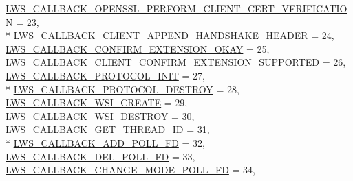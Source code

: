\begin{DoxyCompactItemize}
\hyperlink{group__usercb_ggad62860e19975ba4c4af401c3cdb6abf7ae5ad65d779b7eab32ab67ceff91a3bac}{L\+W\+S\+\_\+\+C\+A\+L\+L\+B\+A\+C\+K\+\_\+\+O\+P\+E\+N\+S\+S\+L\+\_\+\+P\+E\+R\+F\+O\+R\+M\+\_\+\+C\+L\+I\+E\+N\+T\+\_\+\+C\+E\+R\+T\+\_\+\+V\+E\+R\+I\+F\+I\+C\+A\+T\+I\+ON} = 23, 
\\*
\hyperlink{group__usercb_ggad62860e19975ba4c4af401c3cdb6abf7a909cc2a7018864b0b71abacc4058fd8f}{L\+W\+S\+\_\+\+C\+A\+L\+L\+B\+A\+C\+K\+\_\+\+C\+L\+I\+E\+N\+T\+\_\+\+A\+P\+P\+E\+N\+D\+\_\+\+H\+A\+N\+D\+S\+H\+A\+K\+E\+\_\+\+H\+E\+A\+D\+ER} = 24, 
\hyperlink{group__usercb_ggad62860e19975ba4c4af401c3cdb6abf7a390da3639296660a78cc1a5dcb19037e}{L\+W\+S\+\_\+\+C\+A\+L\+L\+B\+A\+C\+K\+\_\+\+C\+O\+N\+F\+I\+R\+M\+\_\+\+E\+X\+T\+E\+N\+S\+I\+O\+N\+\_\+\+O\+K\+AY} = 25, 
\hyperlink{group__usercb_ggad62860e19975ba4c4af401c3cdb6abf7a1ce5b22039ca37ee224d00047596ea46}{L\+W\+S\+\_\+\+C\+A\+L\+L\+B\+A\+C\+K\+\_\+\+C\+L\+I\+E\+N\+T\+\_\+\+C\+O\+N\+F\+I\+R\+M\+\_\+\+E\+X\+T\+E\+N\+S\+I\+O\+N\+\_\+\+S\+U\+P\+P\+O\+R\+T\+ED} = 26, 
\hyperlink{group__usercb_ggad62860e19975ba4c4af401c3cdb6abf7ad5d34583e3556e153eda91620b48cc49}{L\+W\+S\+\_\+\+C\+A\+L\+L\+B\+A\+C\+K\+\_\+\+P\+R\+O\+T\+O\+C\+O\+L\+\_\+\+I\+N\+IT} = 27, 
\\*
\hyperlink{group__usercb_ggad62860e19975ba4c4af401c3cdb6abf7a54269ca88508e6efd3afdb9d360a9caa}{L\+W\+S\+\_\+\+C\+A\+L\+L\+B\+A\+C\+K\+\_\+\+P\+R\+O\+T\+O\+C\+O\+L\+\_\+\+D\+E\+S\+T\+R\+OY} = 28, 
\hyperlink{group__usercb_ggad62860e19975ba4c4af401c3cdb6abf7afd8fd77a1cc9405fcb4f26915d7f2d01}{L\+W\+S\+\_\+\+C\+A\+L\+L\+B\+A\+C\+K\+\_\+\+W\+S\+I\+\_\+\+C\+R\+E\+A\+TE} = 29, 
\hyperlink{group__usercb_ggad62860e19975ba4c4af401c3cdb6abf7aca834dc035b7f7486f9ce40fde54fe9e}{L\+W\+S\+\_\+\+C\+A\+L\+L\+B\+A\+C\+K\+\_\+\+W\+S\+I\+\_\+\+D\+E\+S\+T\+R\+OY} = 30, 
\hyperlink{group__usercb_ggad62860e19975ba4c4af401c3cdb6abf7adfb41c92e2522712207ef7f2462b5e34}{L\+W\+S\+\_\+\+C\+A\+L\+L\+B\+A\+C\+K\+\_\+\+G\+E\+T\+\_\+\+T\+H\+R\+E\+A\+D\+\_\+\+ID} = 31, 
\\*
\hyperlink{group__usercb_ggad62860e19975ba4c4af401c3cdb6abf7ab69783a9fbf2ca71ad70706bda77b412}{L\+W\+S\+\_\+\+C\+A\+L\+L\+B\+A\+C\+K\+\_\+\+A\+D\+D\+\_\+\+P\+O\+L\+L\+\_\+\+FD} = 32, 
\hyperlink{group__usercb_ggad62860e19975ba4c4af401c3cdb6abf7a1df60f314710236f9b53efbf468da768}{L\+W\+S\+\_\+\+C\+A\+L\+L\+B\+A\+C\+K\+\_\+\+D\+E\+L\+\_\+\+P\+O\+L\+L\+\_\+\+FD} = 33, 
\hyperlink{group__usercb_ggad62860e19975ba4c4af401c3cdb6abf7aa87d2e82fffa42c3680c7403ef94216e}{L\+W\+S\+\_\+\+C\+A\+L\+L\+B\+A\+C\+K\+\_\+\+C\+H\+A\+N\+G\+E\+\_\+\+M\+O\+D\+E\+\_\+\+P\+O\+L\+L\+\_\+\+FD} = 34, 

\end{DoxyCompactItemize}
